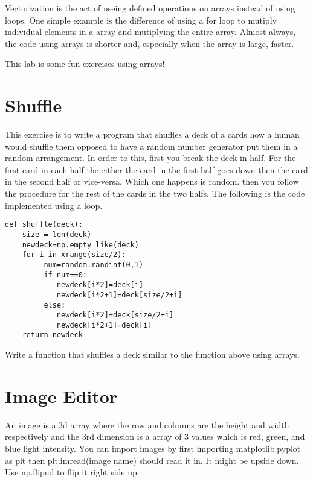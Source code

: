 \label{lab:Python_Vectorization}

Vectorization is the act of useing defined operations on arrays instead of using loops. One simple example is the difference of using a for loop to mutiply individual elements in a array and mutiplying the entire array. Almost always, the code using arrays is shorter and, especially when the array is large, faster.

This lab is some fun exercises using arrays!

\section*{Shuffle}

This exercise is to write a program that shuffles a deck of a cards how a human would shuffle them opposed to have a random number generator put them in a random arrangement. In order to this, first you break the deck in half. For the first card in each half the either the card in the first half goes down then the card in the second half or vice-versa. Which one happens is random. then you follow the procedure for the rest of the cards in the two halfs. The following is the code implemented using a loop. 

\begin{lstlisting}
def shuffle(deck):
    size = len(deck)
    newdeck=np.empty_like(deck)
    for i in xrange(size/2):
         num=random.randint(0,1)
         if num==0:
            newdeck[i*2]=deck[i]
            newdeck[i*2+1]=deck[size/2+i]
         else:
            newdeck[i*2]=deck[size/2+i]
            newdeck[i*2+1]=deck[i]
    return newdeck
\end{lstlisting}

\begin{problem}
Write a function that shuffles a deck similar to the function above using arrays.
\end{problem}

\section*{Image Editor}

An image is a 3d array where the row and columns are the height and width respectively and the 3rd dimension is a array of 3 values which is red, green, and blue light intensity. You can import images by first importing matplotlib.pyplot as plt then plt.imread(image name) should read it in. It might be upside down. Use np.flipud to flip it right side up.

